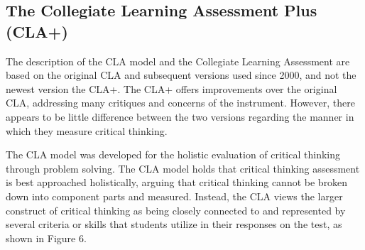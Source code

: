\subsection{The Collegiate Learning Assessment Plus (CLA+)}

The description of the CLA model and the Collegiate Learning Assessment are based on the original CLA and subsequent versions used since 2000, and not the newest version the CLA+.  The CLA+ offers improvements over the original CLA, addressing many critiques and concerns of the instrument.  However, there appears to be little difference between the two versions regarding the manner in which they measure critical thinking.

The CLA model was developed for the holistic evaluation of critical thinking through problem solving.  The CLA model holds that critical thinking assessment is best approached holistically, arguing that critical thinking cannot be broken down into component parts and measured. Instead, the CLA views the larger construct of critical thinking as being closely connected to and represented by several criteria or skills that students utilize in their responses on the test, as shown in Figure 6.
